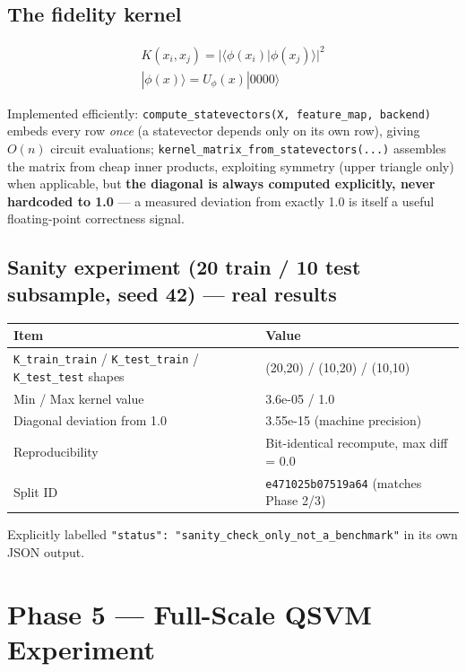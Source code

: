 \documentclass[11pt,a4paper]{article}
\newcommand{\code}[1]{\texttt{\small #1}}
\begin{document}
\subsection{The fidelity kernel}
\begin{gather*}
K(x_i, x_j) = |\langle\phi(x_i)|\phi(x_j)\rangle|^2 \\
|\phi(x)\rangle = U_\phi(x)|0000\rangle
\end{gather*}
\begin{sloppypar}
Implemented efficiently: \code{compute\_statevectors(X, feature\_map, backend)} embeds every row \emph{once} (a statevector depends only on its own row), giving $O(n)$ circuit evaluations; \code{kernel\_matrix\_from\_statevectors(...)} assembles the matrix from cheap inner products, exploiting symmetry (upper triangle only) when applicable, but \textbf{the diagonal is always computed explicitly, never hardcoded to 1.0} --- a measured deviation from exactly 1.0 is itself a useful floating-point correctness signal.
\end{sloppypar}

\subsection{Sanity experiment (20 train / 10 test subsample, seed 42) --- real results}
\begin{tabularx}{\textwidth}{@{}p{4.4cm}Y@{}}
\toprule
\textbf{Item} & \textbf{Value} \\
\midrule
\code{K\_train\_train} / \code{K\_test\_train} / \code{K\_test\_test} shapes & (20,20) / (10,20) / (10,10) \\
Min / Max kernel value & 3.6e-05 / 1.0 \\
Diagonal deviation from 1.0 & 3.55e-15 (machine precision) \\
Reproducibility & Bit-identical recompute, max diff = 0.0 \\
Split ID & \code{e471025b07519a64} (matches Phase 2/3) \\
\bottomrule
\end{tabularx}
Explicitly labelled \code{"status": "sanity\_check\_only\_not\_a\_benchmark"} in its own JSON output.

\section{Phase 5 --- Full-Scale QSVM Experiment}
\label{sec:phase5}
\end{document}

